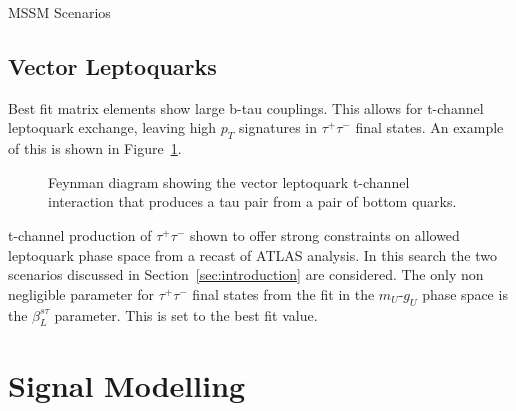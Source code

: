 MSSM Scenarios

\subsection{Vector Leptoquarks}
\label{sec:vlq}

Best fit matrix elements show large b-tau couplings.
This allows for t-channel leptoquark exchange, leaving high $p_{T}$ signatures in $\tau^{+}\tau^{-}$ final states.
An example of this is shown in Figure~\ref{fig:leptoquark_feynman}.

\begin{figure}[H]
\centering
{}
\caption{Feynman diagram showing the vector leptoquark t-channel interaction that produces a tau pair from a pair of bottom quarks.}
\label{fig:leptoquark_feynman}
\end{figure}

t-channel production of $\tau^{+}\tau^{-}$ shown to offer strong constraints on allowed leptoquark phase space from a recast of ATLAS analysis.
In this search the two scenarios discussed in Section~\ref{sec:introduction} are considered.
The only non negligible parameter for $\tau^{+}\tau^{-}$ final states from the fit in the $m_{U}$-$g_{U}$ phase space is the $\beta_{L}^{s\tau}$ parameter.
This is set to the best fit value.

\section{Signal Modelling}

